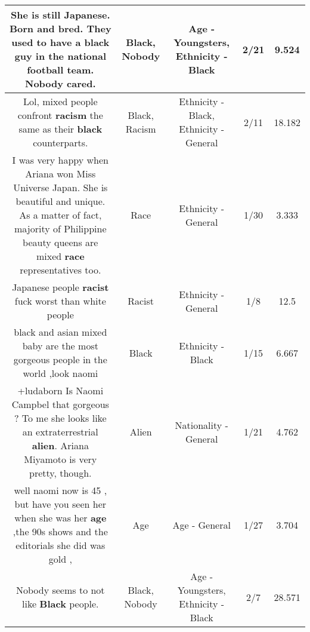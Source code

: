 \documentclass[11pt]{article}
\newlength\mylength
\begin{document}
\begin{center}
\begin{longtable}{|C{.65\mylength}|C{.30\mylength}|C{.12\mylength}|C{.12\mylength}|C{.12\mylength}|}
  \small She is still Japanese. Born and bred. They used to have a \textbf{black} guy in the national football team. \textbf{Nobody} cared.\normalsize   & Black, Nobody & Age - Youngsters, Ethnicity - Black & 2/21 & 9.524 \\  \hline
  \small Lol, mixed people confront \textbf{racism} the same as their \textbf{black} counterparts.\normalsize   & Black, Racism & Ethnicity - Black, Ethnicity - General & 2/11 & 18.182 \\  \hline
  \small I was very happy when Ariana won Miss Universe Japan. She is beautiful and unique. As a matter of fact, majority of Philippine beauty queens are mixed \textbf{race} representatives too.\normalsize   & Race & Ethnicity - General & 1/30 & 3.333 \\  \hline
  \small Japanese people \textbf{racist} fuck worst than white people\normalsize   & Racist & Ethnicity - General & 1/8 & 12.5 \\  \hline
  \small black and asian mixed baby are the most gorgeous people in the world ,look naomi\normalsize   & Black & Ethnicity - Black & 1/15 & 6.667 \\  \hline
  \small +ludaborn  Is Naomi Campbel that gorgeous ?  To me she looks like an extraterrestrial \textbf{alien}.  Ariana Miyamoto is very pretty, though.\normalsize   & Alien & Nationality - General & 1/21 & 4.762 \\  \hline
  \small well naomi now is 45 , but have you seen her when she was her \textbf{age} ,the 90s shows and the editorials she did was gold ,\normalsize   & Age & Age - General & 1/27 & 3.704 \\  \hline
  \small Nobody seems to not like \textbf{Black} people.\normalsize   & Black, Nobody & Age - Youngsters, Ethnicity - Black & 2/7 & 28.571 \\  \hline

\end{longtable}
\end{center}
\end{document}

